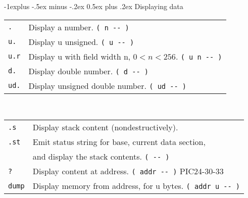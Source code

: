 \documentclass[10pt,landscape,a4paper]{article}
\makeatletter
\renewcommand{\subsection}{\@startsection{subsection}{2}{0mm}%
                                {-1explus -.5ex minus -.2ex}%
                                {0.5ex plus .2ex}%
                                {\normalfont\normalsize\bfseries}}
\makeatother
\begin{document}
\begin{multicols}{3}
\subsection{Displaying data}
\begin{tabular}{@{}ll@{}}
\verb!.!  & Display a number. \verb!( n -- )! \\
\verb!u.!  & Display u unsigned. \verb!( u -- )! \\
\verb!u.r!  & Display u with field width n, $0<n<256$. \verb!( u n -- )! \\
\verb!d.!  & Display double number.  \verb!( d -- )! \\
\verb!ud.!  & Display unsigned double number. \verb!( ud -- )! \\
\end{tabular}\\
\begin{tabular}{@{}ll@{}}
\verb!.s!  & Display stack content (nondestructively). \\
\verb!.st!  & Emit status string for base, current data section, \\
            & and display the stack contents. \verb!( -- )! \\
\verb!?! & Display content at address. \verb!( addr -- )! PIC24-30-33 \\
\verb!dump!  & Display memory from address, for u bytes. \verb!( addr u -- )! \\
\end{tabular}


\end{multicols}
\end{document}
